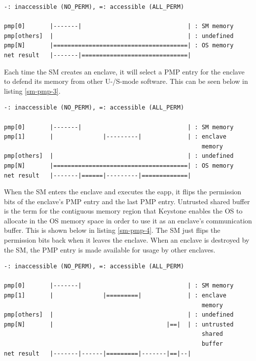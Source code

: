 \begin{lstlisting}[frame=single,showspaces=true,caption={Memory state just after booting \cite{keystone-doc}},captionpos=b,label={sm-pmp-2}]
-: inaccessible (NO_PERM), =: accessible (ALL_PERM)

pmp[0]       |-------|                              | : SM memory
pmp[others]  |                                      | : undefined
pmp[N]       |======================================| : OS memory
net result   |-------|==============================|
\end{lstlisting}
\noindent
Each time the SM creates an enclave, it will select a PMP entry for the enclave to defend its memory from other U-/S-mode software. This can be seen below in listing \ref{sm-pmp-3}. \\
\begin{lstlisting}[frame=single,showspaces=true,caption={Memory accessible by the untrusted host \cite{keystone-doc}},captionpos=b,label={sm-pmp-3}]
-: inaccessible (NO_PERM), =: accessible (ALL_PERM)

pmp[0]       |-------|                              | : SM memory
pmp[1]       |              |---------|             | : enclave 
                                                        memory
pmp[others]  |                                      | : undefined
pmp[N]       |======================================| : OS memory
net result   |-------|======|---------|=============|
\end{lstlisting}
\noindent
When the SM enters the enclave and executes the eapp, it flips the permission bits of the enclave's PMP entry and the last PMP entry. Untrusted shared buffer is the term for the contiguous memory region that Keystone enables the OS to allocate in the OS memory space in order to use it as an enclave's communication buffer. This is shown below in listing \ref{sm-pmp-4}.
The SM just flips the permission bits back when it leaves the enclave. When an enclave is destroyed by the SM, the PMP entry is made available for usage by other enclaves. \\
\begin{lstlisting}[frame=single,showspaces=true,caption={Memory accessible by a running enclave \cite{keystone-doc}},captionpos=b,label={sm-pmp-4}]
-: inaccessible (NO_PERM), =: accessible (ALL_PERM)

pmp[0]       |-------|                              | : SM memory
pmp[1]       |              |=========|             | : enclave 
                                                        memory
pmp[others]  |                                      | : undefined
pmp[N]       |                                |==|  | : untrusted 
                                                        shared 
                                                        buffer
net result   |-------|------|=========|-------|==|--|
\end{lstlisting}


